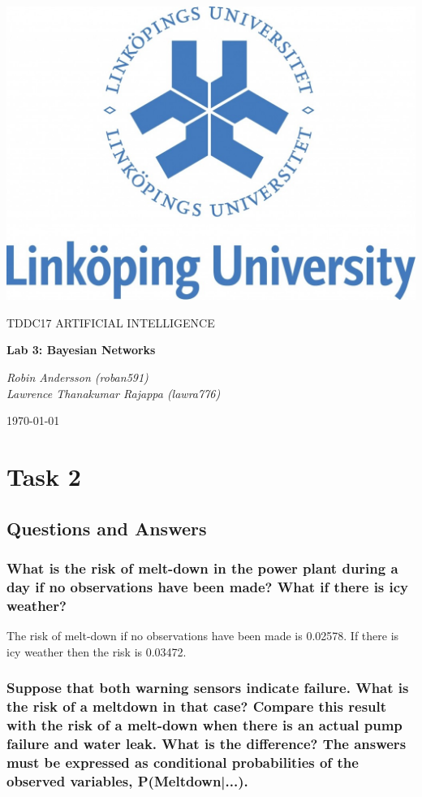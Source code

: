 \documentclass[a4paper,10pt]{article}
\begin{document}
\begin{titlepage}
	\centering
	\includegraphics[width=.6\textwidth]{liu-logo.png}\par
	\vfill
	{\scshape\Large TDDC17 ARTIFICIAL INTELLIGENCE\par}
	{\huge\bfseries Lab 3: Bayesian Networks\par}
	\vspace{1cm}
	{\large\itshape Robin Andersson (roban591) \\ Lawrence Thanakumar Rajappa (lawra776)\par}
	\vfill
	{\large \today\par}
\end{titlepage}

\section{Task 2}

\subsection{Questions and Answers}

\subsubsection{What is the risk of melt-down in the power plant during a day if no observations have been made? What if there is icy weather?}

The risk of melt-down if no observations have been made is 0.02578.
If there is icy weather then the risk is 0.03472.

\subsubsection{Suppose that both warning sensors indicate failure. 
What is the risk of a meltdown in that case? 
Compare this result with the risk of a melt-down when there is an actual pump failure and water leak. 
What is the difference? 
The answers must be expressed as conditional probabilities of the observed variables, P(Meltdown|...).}
\end{document}
